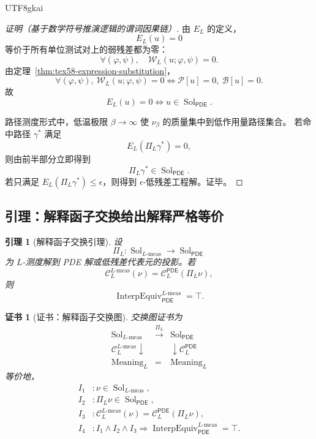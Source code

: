 \documentclass[12pt]{article}
\newtheorem{lemma}{引理}[section]
\newtheorem{Certificate}{证书}[section]
\newcommand{\Pcal}{\mathcal P}
\newcommand{\Bcal}{\mathcal B}
\newcommand{\PDE}{\ensuremath{\mathsf{PDE}}}
\DeclareMathOperator{\Sol}{Sol}
\DeclareMathOperator{\InterpEquiv}{InterpEquiv}
\newcommand{\Lmeas}{L\text{-}\mathrm{meas}}
\newcommand{\Meaning}{\mathrm{Meaning}}
\begin{document}
\begin{CJK*}{UTF8}{gkai}
\begin{proof}[证明（基于数学符号推演逻辑的谓词因果链）]
由 \(E_L\) 的定义，
\[
  E_L(u)=0
\]
等价于所有单位测试对上的弱残差都为零：
\[
  \forall(\varphi,\psi),\quad
  \mathcal W_L(u;\varphi,\psi)=0.
\]
由定理~\ref{thm:tex58-expression-substitution}，
\[
  \forall(\varphi,\psi),\
  \mathcal W_L(u;\varphi,\psi)=0
  \Longleftrightarrow
  \Pcal[u]=0,\ \Bcal[u]=0.
\]
故
\[
  E_L(u)=0
  \Longleftrightarrow
  u\in\Sol_{\PDE}.
\]

路径测度形式中，低温极限 \(\beta\to\infty\) 使 \(\nu_\beta\) 的质量集中到低作用量路径集合。
若命中路径 \(\gamma^\ast\) 满足
\[
  E_L(\Pi_L\gamma^\ast)=0,
\]
则由前半部分立即得到
\[
  \Pi_L\gamma^\ast\in\Sol_{\PDE}.
\]
若只满足 \(E_L(\Pi_L\gamma^\ast)\le\epsilon\)，则得到 \(\epsilon\)-低残差工程解。证毕。
\end{proof}

\subsection{引理：解释函子交换给出解释严格等价}
\label{subsec:tex58-interpretation-equivalence-lemma}

\begin{lemma}[解释函子交换引理]
\label{lem:tex58-interpretation-equivalence}
设
\[
  \Pi_L:\Sol_{\Lmeas}\to\Sol_{\PDE}
\]
为 \(L\)-测度解到 PDE 解或低残差代表元的投影。若
\[
  \mathcal C_L^{\Lmeas}(\nu)
  =
  \mathcal C_L^{\PDE}(\Pi_L\nu),
\]
则
\[
  \InterpEquiv_{\PDE}^{\Lmeas}=\top.
\]
\end{lemma}

\begin{Certificate}[证书：解释函子交换图]
\label{cert:tex58-interpretation-equivalence}
交换图证书为
\[
\begin{array}{ccc}
  \Sol_{\Lmeas} & \xrightarrow{\Pi_L} & \Sol_{\PDE}\\
  \mathcal C_L^{\Lmeas}\downarrow & & \downarrow \mathcal C_L^{\PDE}\\
  \Meaning_L & = & \Meaning_L
\end{array}
\]
等价地，
\[
\begin{aligned}
  I_1 &: \nu\in\Sol_{\Lmeas},\\
  I_2 &: \Pi_L\nu\in\Sol_{\PDE},\\
  I_3 &: \mathcal C_L^{\Lmeas}(\nu)
  =
  \mathcal C_L^{\PDE}(\Pi_L\nu),\\
  I_4 &: I_1\wedge I_2\wedge I_3
  \Rightarrow
  \InterpEquiv_{\PDE}^{\Lmeas}=\top.
\end{aligned}
\]
\end{Certificate}


\end{CJK*}
\end{document}
